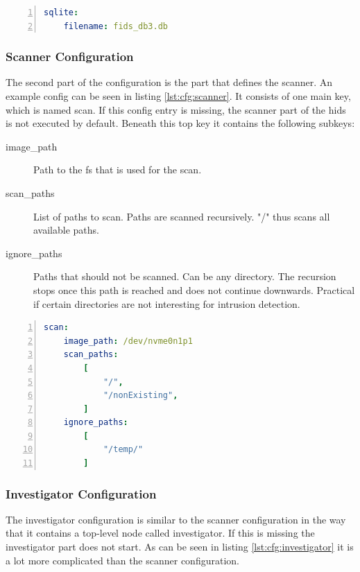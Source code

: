 \begin{lstlisting}[language=yaml, numbers=left, caption=SQLite Configuration, label=lst:cfg:sqlite]
sqlite:
	filename: fids_db3.db
\end{lstlisting}

\subsubsection{Scanner Configuration}

The second part of the configuration is the part that defines the scanner. An example config can be seen in listing \ref{lst:cfg:scanner}. It consists of one main key, which is named scan. If this config entry is missing, the scanner part of the \gls{hids} is not executed by default. Beneath this top key it contains the following subkeys:

\begin{description}
	\item [image\_path] Path to the \gls{fs} that is used for the scan.
	\item [scan\_paths] List of paths to scan. Paths are scanned recursively. "/" thus scans all available paths.
	\item [ignore\_paths] Paths that should not be scanned. Can be any directory. The recursion stops once this path is reached and does not continue downwards. Practical if certain directories are not interesting for intrusion detection.
\end{description}

\begin{lstlisting}[language=yaml, numbers=left, caption=Scanner Configuration, label=lst:cfg:scanner]
scan:
	image_path: /dev/nvme0n1p1
	scan_paths: 
		[
			"/",
			"/nonExisting",
		]
	ignore_paths: 
		[
			"/temp/"
		]
\end{lstlisting}

\subsubsection{Investigator Configuration}
\label{sec:conf:investigator}

The investigator configuration is similar to the scanner configuration in the way that it contains a top-level node called investigator. If this is missing the investigator part does not start. As can be seen in listing \ref{lst:cfg:investigator} it is a lot more complicated than the scanner configuration. 

